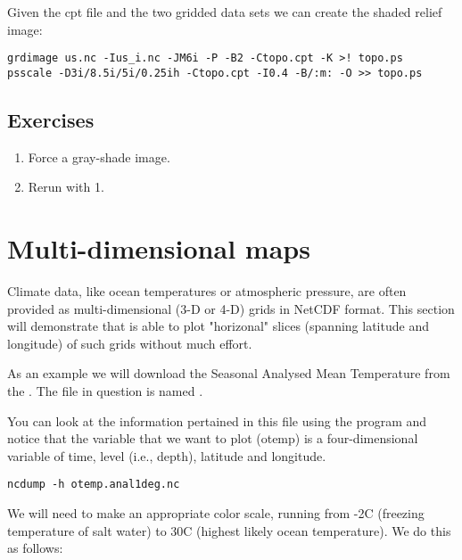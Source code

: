 \documentclass{report}
\begin{document}
Given the cpt file and the two gridded data sets we can
create the shaded relief image:

\begin{verbatim}
grdimage us.nc -Ius_i.nc -JM6i -P -B2 -Ctopo.cpt -K >! topo.ps
psscale -D3i/8.5i/5i/0.25ih -Ctopo.cpt -I0.4 -B/:m: -O >> topo.ps
\end{verbatim}

\subsection{Exercises}

\begin{enumerate}

\item Force a gray-shade image.

\item Rerun  with 1.

\end{enumerate}

\section{Multi-dimensional maps}

Climate data, like ocean temperatures or atmospheric pressure, are often provided as
multi-dimensional (3-D or 4-D) grids in NetCDF format. This section will demonstrate
that \GMT{} is able to plot "horizonal"
slices (spanning latitude and longitude) of such grids without much effort.

As an example we will download the Seasonal Analysed Mean Temperature from the
.
The file in question is named 
.

You can look at the information pertained in this file using the program  and
notice that the variable that we want to plot (otemp) is a four-dimensional variable of time,
level (i.e., depth), latitude and longitude.

\begin{verbatim}
ncdump -h otemp.anal1deg.nc
\end{verbatim}

We will need to make an appropriate color scale, running from -2\DS C (freezing temperature of salt
water) to 30\DS C (highest likely ocean temperature). We do this as follows:
\end{document}
